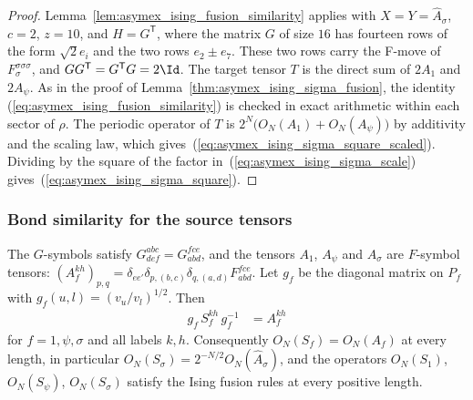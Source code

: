 \begin{proof}
    \leanok
    Lemma~\ref{lem:asymex_ising_fusion_similarity} applies with
    $X=Y=\widehat A_\sigma$, $c=2$, $z=10$, and $H=G^{\mathsf T}$, where the
    matrix $G$ of size $16$ has fourteen rows of the form $\sqrt2e_i$ and
    the two rows $e_2\pm e_7$. These two rows carry the F-move of
    $F^{\sigma\sigma\sigma}_{\sigma}$, and $GG^{\mathsf T}=G^{\mathsf T}G=2\Id$. The target
    tensor $T$ is the direct sum of $2A_1$ and $2A_\psi$. As in the proof
    of Lemma~\ref{thm:asymex_ising_sigma_fusion}, the identity
    (\ref{eq:asymex_ising_fusion_similarity}) is checked in exact
    arithmetic within each sector of $\rho$. The periodic operator of
    $T$ is $2^N\bigl(O_N(A_1)+O_N(A_\psi)\bigr)$ by additivity and the
    scaling law, which gives~(\ref{eq:asymex_ising_sigma_square_scaled}).
    Dividing by the square of the factor
    in~(\ref{eq:asymex_ising_sigma_scale}) gives~(\ref{eq:asymex_ising_sigma_square}).
\end{proof}

\subsubsection{Bond similarity for the source tensors}



\begin{lemma}
    \label{thm:asymex_ising_gsymbol_similarity}
    \leanok
    The $G$-symbols satisfy $G^{abc}_{def}=G^{fce}_{abd}$, and the tensors
    $A_1$, $A_\psi$ and $A_\sigma$ are $F$-symbol tensors:
    $(A_f^{kh})_{p,q}=\delta_{ee'}\delta_{p,(b,c)}\delta_{q,(a,d)}F^{fce}_{abd}$.
    Let $g_f$ be the diagonal matrix on $P_f$ with
    $g_f(u,l)=(v_u/v_l)^{1/2}$. Then
    \begin{align}
        g_f\,S_f^{kh}\,g_f^{-1} & =A_f^{kh}
        \label{eq:asymex_ising_gsymbol_conj}
    \end{align}
    for $f=1,\psi,\sigma$ and all labels $k,h$. Consequently
    $O_N(S_f)=O_N(A_f)$ at every length, in particular
    $O_N(S_\sigma)=2^{-N/2}O_N(\widehat A_\sigma)$, and the operators
    $O_N(S_1)$, $O_N(S_\psi)$, $O_N(S_\sigma)$ satisfy the Ising fusion rules
    at every positive length.
\end{lemma}

